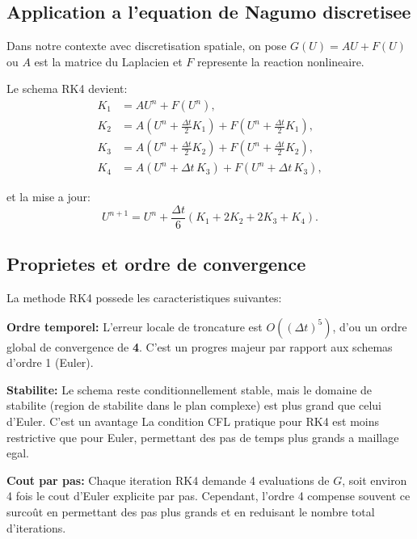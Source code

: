 \documentclass[11pt,a4paper]{report}
\begin{document}
\subsection*{Application a l'equation de Nagumo discretisee}
Dans notre contexte avec discretisation spatiale, on pose $G(U)=AU+F(U)$ ou
$A$ est la matrice du Laplacien et $F$ represente la reaction nonlineaire.

Le schema RK4 devient:
\begin{align}
 K_1 &= AU^n + F(U^n), \\
 K_2 &= A\left(U^n + \frac{\Delta t}{2}K_1\right) + F\left(U^n + \frac{\Delta t}{2}K_1\right), \\
 K_3 &= A\left(U^n + \frac{\Delta t}{2}K_2\right) + F\left(U^n + \frac{\Delta t}{2}K_2\right), \\
 K_4 &= A\left(U^n + \Delta t\, K_3\right) + F\left(U^n + \Delta t\, K_3\right),
\end{align}

et la mise a jour:
\begin{equation}
 U^{n+1} = U^n + \frac{\Delta t}{6}(K_1 + 2K_2 + 2K_3 + K_4).
\end{equation}

\subsection*{Proprietes et ordre de convergence}
La methode RK4 possede les caracteristiques suivantes:

\textbf{Ordre temporel:} L'erreur locale de troncature est $O((\Delta t)^5)$, d'ou un ordre
global de convergence de \textbf{4}. C'est un progres majeur par rapport aux schemas
d'ordre 1 (Euler).

\textbf{Stabilite:} Le schema reste conditionnellement stable, mais le domaine de stabilite
(region de stabilite dans le plan complexe) est plus grand que celui d'Euler. C'est un avantage
La condition CFL pratique pour RK4 est moins restrictive que pour Euler, permettant des
pas de temps plus grands a maillage egal.

\textbf{Cout par pas:} Chaque iteration RK4 demande 4 evaluations de $G$, soit environ 4 fois
le cout d'Euler explicite par pas. Cependant, l'ordre 4 compense souvent ce surco\^{u}t en
permettant des pas plus grands et en reduisant le nombre total d'iterations.
\end{document}
